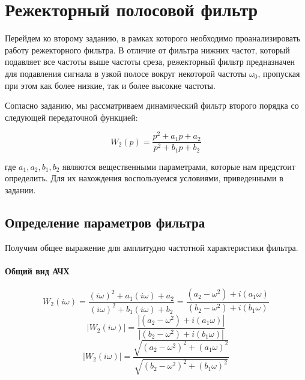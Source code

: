 \section{Режекторный полосовой фильтр}

Перейдем ко второму заданию, в рамках которого необходимо проанализировать работу режекторного фильтра. В отличие от фильтра нижних частот, который подавляет все частоты выше частоты среза, режекторный фильтр предназначен для подавления сигнала в узкой полосе вокруг некоторой частоты $\omega_0$, пропуская при этом как более низкие, так и более высокие частоты.

Согласно заданию, мы рассматриваем динамический фильтр второго порядка со следующей передаточной функцией:

\begin{equation*}
    W_2(p) = \frac{p^2 + a_1p + a_2}{p^2 + b_1p + b_2}
\end{equation*}

где $a_1, a_2, b_1, b_2$ являются вещественными параметрами, которые нам предстоит определить. Для их нахождения воспользуемся условиями, приведенными в задании.


\subsection{Определение параметров фильтра}

Получим общее выражение для амплитудно частотной характеристики фильтра.

\paragraph{Общий вид АЧХ}
\begin{equation*}
    W_2(i\omega) = \frac{(i\omega)^2 + a_1(i\omega) + a_2}{(i\omega)^2 + b_1(i\omega) + b_2} = \frac{(a_2 - \omega^2) + i(a_1\omega)}{(b_2 - \omega^2) + i(b_1\omega)}
\end{equation*}
\begin{equation*}
    |W_2(i\omega)| = \frac{|(a_2 - \omega^2) + i(a_1\omega)|}{|(b_2 - \omega^2) + i(b_1\omega)|}
\end{equation*}
\begin{equation*}
    |W_2(i\omega)| = \frac{\sqrt{(a_2 - \omega^2)^2 + (a_1\omega)^2}}{\sqrt{(b_2 - \omega^2)^2 + (b_1\omega)^2}}
\end{equation*}

